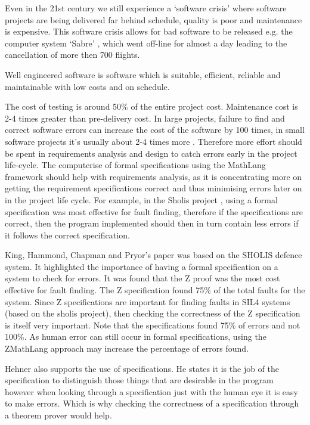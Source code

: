 Even in the 21st century we still experience a `software crisis' where software projects are being delivered far behind schedule, quality is poor and maintenance is expensive. This software crisis allows for bad software to be released e.g. the computer system `Sabre' \cite{sabre}, which went off-line for almost a day leading to the cancellation of more then 700 flights.

Well engineered software is software which is suitable, efficient, reliable and maintainable with low costs and on schedule.

The cost of testing is around 50\% of the entire project cost. Maintenance cost is 2-4 times greater than pre-delivery cost. In large projects, failure to find and correct software errors can increase the cost of the software by 100 times, in small software projects it's usually about 2-4 times more \cite{andrewslides}.
Therefore more effort should be spent in requirements analysis and design to catch errors early in the project life-cycle. The \gls{computerise} of formal specifications using the MathLang framework should help with requirements analysis, as it is concentrating more on getting the requirement specifications correct and thus minimising errors later on in the project life cycle. For example, in the Sholis project \cite{sholis}, using a formal specification was most effective for fault finding, therefore if the specifications are correct, then the program implemented should then in turn contain less errors if it follows the correct specification.

King, Hammond, Chapman and Pryor's paper \cite{sholis} was based on the SHOLIS defence system. It highlighted the importance of having a formal specification on a system to check for errors. It was found that the Z proof was the most cost effective for fault finding. The Z specification found 75\% of the total faults for the system. Since Z specifications are important for finding faults in SIL4 systems (based on the sholis project), then checking the correctness of the Z specification is itself very important. Note that the specifications found 75\% of errors and not 100\%. As human error can still occur in formal specifications, using the ZMathLang approach may increase the percentage of errors found.

Hehner \cite{hehner99} also supports the use of specifications. He states it is the job of the specification to distinguish those things that are desirable in the program however when looking through a specification just with the human eye \cite{sholis} it is easy to make errors. Which is why checking the correctness of a specification through a theorem prover would help.

